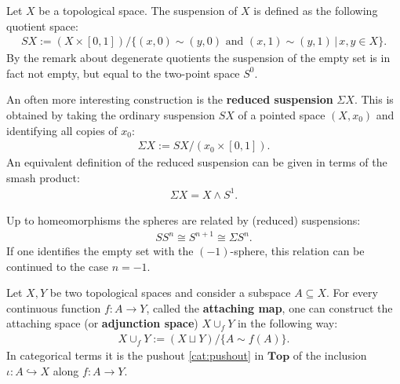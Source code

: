     \begin{construct}[Suspension]\label{topology:suspension}
        Let $X$ be a topological space. The suspension of $X$ is defined as the following quotient space:
        \begin{gather}
            SX := (X\times [0,1])/\big\{(x,0)\sim (y,0)\text{ and }(x,1)\sim (y,1)\,\big\vert\,x,y\in X\big\}.
        \end{gather}
        By the remark about degenerate quotients the suspension of the empty set is in fact not empty, but equal to the two-point space $S^0$.

        An often more interesting construction is the \textbf{reduced suspension} $\Sigma X$. This is obtained by taking the ordinary suspension $SX$ of a pointed space $(X,x_0)$ and identifying all copies of $x_0$:
        \begin{gather}
            \Sigma X := SX/(x_0\times[0,1]).
        \end{gather}
        An equivalent definition of the reduced suspension can be given in terms of the smash product:
        \begin{gather}
            \Sigma X = X\wedge S^1.
        \end{gather}
    \end{construct}
    \begin{example}[Spheres]\label{topology:sphere_suspension}
        Up to homeomorphisms the spheres are related by (reduced) suspensions:
        \begin{gather}
            SS^n\cong S^{n+1}\cong\Sigma S^n.
        \end{gather}
        If one identifies the empty set with the $(-1)$-sphere, this relation can be continued to the case $n=-1$.
    \end{example}

    \begin{construct}\label{topology:attaching_space}
        Let $X,Y$ be two topological spaces and consider a subspace $A\subseteq X$. For every continuous function $f:A\rightarrow Y$, called the \textbf{attaching map}, one can construct the attaching space (or \textbf{adjunction space}) $X\cup_f Y$ in the following way:
        \begin{gather}
            X\cup_f Y := (X\sqcup Y)/\{A\sim f(A)\}.
        \end{gather}
        In categorical terms it is the pushout \ref{cat:pushout} in $\mathbf{Top}$ of the inclusion $\iota:A\hookrightarrow X$ along $f:A\rightarrow Y$.
    \end{construct}

